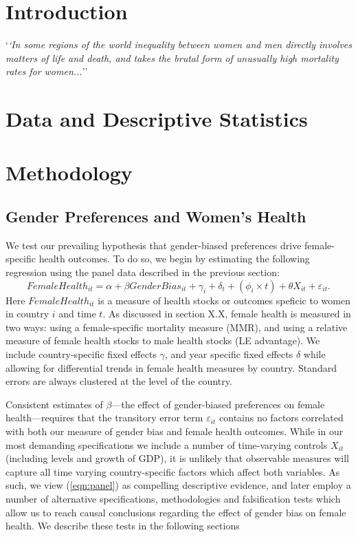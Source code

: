 \documentclass[11pt]{article}
\begin{document}
\thispagestyle{empty}
\setlength{\baselineskip}{1.4\baselineskip} 
\newpage 
\begin{spacing}{1.4}

\section{Introduction}
\epigraph{`\textit{`In some regions of the world inequality between women and men 
directly involves matters of life and death, and takes the brutal form of unusually 
high mortality rates for women...}'' }{\citet{sen2001many}}


\section{Data and Descriptive Statistics}



\section{Methodology}
\label{scn:methodology}
\subsection{Gender Preferences and Women's Health}
We test our prevailing hypothesis that gender-biased preferences drive female-%
specific health outcomes.  To do so, we begin by estimating the following 
regression using the panel data described in the previous section:
\begin{equation}
\label{eqn:panel}
FemaleHealth_{it} = \alpha + \beta GenderBias_{it} + \gamma_i + \delta_t + 
               (\phi_i\times t) + \theta X_{it} + \varepsilon_{it}.
\end{equation}
Here $FemaleHealth_{it}$ is a measure of health stocks or outcomes speficic 
to women in country $i$ and time $t$.  As discussed in section X.X,
female health is measured in two ways: using a female-specific mortality measure
(MMR), and using a relative measure of female health stocks to male health stocks 
(LE advantage).  We include country-specific fixed effects $\gamma$, and year 
specific fixed effects $\delta$ while allowing for differential trends in female 
health measures by country.  Standard errors are always clustered at the level
of the country.

Consistent estimates of $\beta$---the effect of gender-biased preferences on
female health---requires that the transitory error term $\varepsilon_{it}$
contains no factors correlated with both our measure of gender bias and female 
health outcomes.  While in our most demanding specifications we include a 
number of time-varying controls $X_{it}$ (including levels and growth of GDP), 
it is unlikely that observable 
measures will capture all time varying country-specific factors which affect
both variables.  As such, we view (\ref{eqn:panel}) as compelling descriptive 
evidence, and later employ a number of alternative specifications, methodologies 
and falsification tests which allow us to reach causal conclusions regarding the 
effect of gender bias on female health.  We describe these tests in the following 
sections 


\end{spacing}
\end{document}
